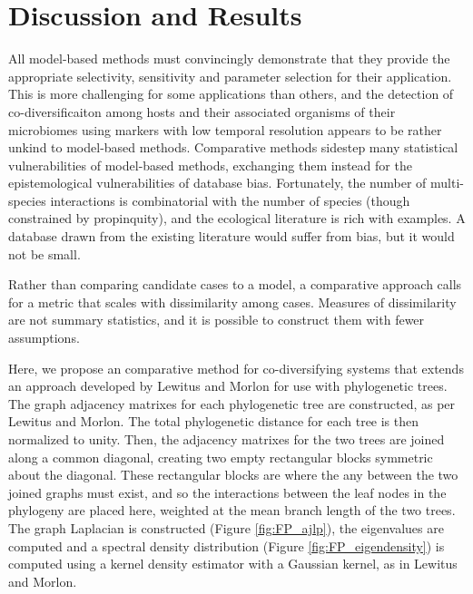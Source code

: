 \section{Discussion and Results}

All model-based methods must convincingly demonstrate that they provide the appropriate selectivity, sensitivity and parameter selection for their application. This is more challenging for some applications than others, and the detection of co-diversificaiton among hosts and their associated organisms of their microbiomes using markers with low temporal resolution appears to be rather unkind to model-based methods. Comparative methods sidestep many statistical vulnerabilities of model-based methods, exchanging them instead for the epistemological vulnerabilities of database bias. Fortunately, the number of multi-species interactions is combinatorial with the number of species (though constrained by propinquity), and the ecological literature is rich with examples. A database drawn from the existing literature would suffer from bias, but it would not be small.

Rather than comparing candidate cases to a model, a comparative approach calls for a metric that scales with dissimilarity among cases. Measures of dissimilarity are not summary statistics, and it is possible to construct them with fewer assumptions. 



Here, we propose an comparative method for co-diversifying systems that extends an approach developed by Lewitus and Morlon \cite{lewitus2015characterizing} for use with phylogenetic trees. The graph adjacency matrixes for each phylogenetic tree are constructed, as per Lewitus and Morlon. The total phylogenetic distance for each tree is then normalized to unity. Then, the adjacency matrixes for the two trees are joined along a common diagonal, creating two empty rectangular blocks symmetric about the diagonal. These rectangular blocks are where the any between the two joined graphs must exist, and so the interactions between the leaf nodes in the phylogeny are placed here, weighted at the mean branch length of the two trees. The graph Laplacian is constructed (Figure \ref{fig:FP_ajlp}), the eigenvalues are computed and a spectral density distribution (Figure \ref{fig:FP_eigendensity}) is computed using a kernel density estimator with a Gaussian kernel, as in Lewitus and Morlon. 



